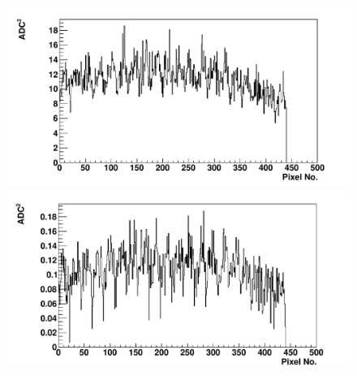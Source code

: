 \begin{figure} %
\includegraphics[width=\textwidth]{chapters/graphs/GainVarsMeas/LL_m04_2016-06-11/Set0and2/varianceHist_StandHV_Average_set0and2.pdf}
\caption{}
\vspace{3mm}
\includegraphics[width=\textwidth]{chapters/graphs/GainVarsMeas/LL_m04_2016-06-11/Set0and2/varianceHist_LowHV_Average_set0and2.pdf}
\caption{}
\end{figure}

